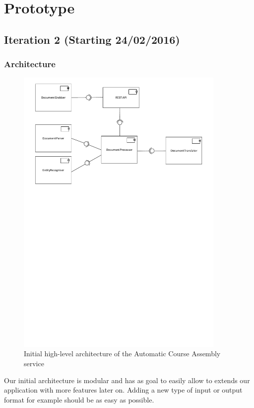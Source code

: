 \documentclass[a4paper,12pt]{article}
\begin{document}
\section{Prototype}
\subsection*{Iteration 2 (Starting 24/02/2016)}
\subsubsection*{Architecture}
\begin{figure}[H]
  \centering
      \includegraphics[width=0.9\textwidth]{design/components}
  \caption{Initial high-level architecture of the Automatic Course Assembly service}
\label{fig:intelligence}
\end{figure}
Our initial architecture is modular and has as goal to easily allow to extends our application with more features later on. Adding a new type of input or output format for example should be as easy as possible.\\
\end{document}
